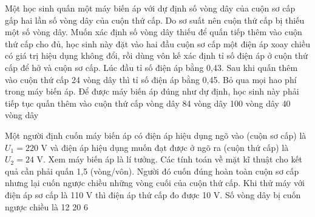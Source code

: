 \begin{vidu} %
	 Một học sinh quấn một máy biến áp với dự định số vòng dây của cuộn sơ cấp gấp hai lần số vòng dây của cuộn thứ cấp. Do sơ suất nên cuộn thứ cấp bị thiếu một số vòng dây. Muốn xác định số vòng dây thiếu để quấn tiếp thêm vào cuộn thứ cấp cho đủ, học sinh này đặt vào hai đầu cuộn sơ cấp một điện áp xoay chiều có giá trị hiệu dụng không đổi, rồi dùng vôn kế xác định tỉ số điện áp ở cuộn thứ cấp để hở và cuộn sơ cấp. Lúc đầu tỉ số điện áp bằng 0,43. Sau khi quấn thêm vào cuộn thứ cấp 24 vòng dây thì tỉ số điện áp bằng 0,45. Bỏ qua mọi hao phí trong máy biến áp. Để được máy biến áp đúng như dự định, học sinh này phải tiếp tục quấn thêm vào cuộn thứ cấp
	\choice
	{ vòng dây}
	{84 vòng dây}
	{100 vòng dây}
	{40 vòng dây}
\end{vidu}
\begin{vidu} %
	Một người định cuốn máy biến áp có điện áp hiệu dụng ngõ vào (cuộn sơ cấp) là $U_1=220$ V và điện áp hiệu dụng muốn đạt được ở ngõ ra (cuộn thứ cấp) là $U_2=24$ V. Xem máy biến áp là lí tưởng. Các tính toán về mặt kĩ thuật cho kết quả cần phải quấn 1,5 (vòng/vôn). Người đó cuốn đúng hoàn toàn cuộn sơ cấp nhưng lại cuốn ngược chiều những vòng cuối của cuộn thứ cấp. Khi thử máy với điện áp sơ cấp là 110 V thì điện áp thứ cấp đo được 10 V. Số vòng dây bị cuốn ngược chiều là
	\choice
	{12}
	{20}
	{}
	{6}
\end{vidu}
